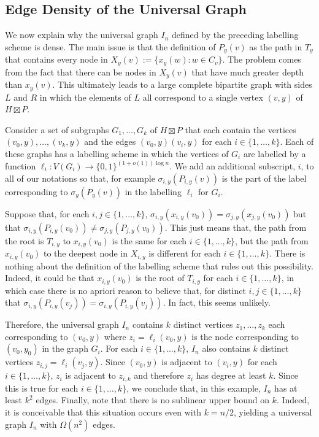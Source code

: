 \documentclass{article}
\begin{document}
\subsection{Edge Density of the Universal Graph}
\label{density-lower-bound}

We now explain why the universal graph $I_n$ defined by the preceding labelling scheme is dense.  The main issue is that the definition of $P_y(v)$ as the path in $T_y$ that contains every node in $X_y(v):=\{x_y(w):w\in C_v\}$.  The problem comes from the fact that there can be nodes in $X_y(v)$ that have much greater depth than $x_y(v)$.  This ultimately leads to a large complete bipartite graph with sides $L$ and $R$ in which the elements of $L$ all correspond to a single vertex $(v,y)$ of $H\boxtimes P$.

Consider a set of subgraphs $G_1,\ldots,G_k$ of $H\boxtimes P$ that each contain the vertices $(v_0,y),\ldots,(v_k,y)$ and the edges $(v_0,y)(v_i,y)$ for each $i\in\{1,\ldots,k\}$.  Each of these graphs has a labelling scheme in which the vertices of $G_i$ are labelled by a function $\ell_i:V(G_i)\to\{0,1\}^{(1+o(1))\log n}$.  We add an additional subscript, $i$, to all of our notations so that, for example $\sigma_{i,y}(P_{i,y}(v))$ is the part of the label corresponding to $\sigma_y(P_y(v))$ in the labelling $\ell_i$ for $G_i$.

Suppose that, for each $i,j\in\{1,\ldots,k\}$, $\sigma_{i,y}(x_{i,y}(v_0))=\sigma_{j,y}(x_{j,y}(v_0))$ but that $\sigma_{i,y}(P_{i,y}(v_0))\neq\sigma_{j,y}(P_{j,y}(v_0))$.  This just means that, the path from the root is $T_{i,y}$ to $x_{i,y}(v_0)$ is the same for each $i\in\{1,\ldots,k\}$, but the path from $x_{i,y}(v_0)$ to the deepest node in $X_{i,y}$ is different for each $i\in\{1,\ldots,k\}$.  There is nothing about the definition of the labelling scheme that rules out this possibility.  Indeed, it could be that $x_{i,y}(v_0)$ is the root of $T_{i,y}$ for each $i\in\{1,\ldots,k\}$, in which case there is no apriori reason to believe that, for distinct $i,j\in\{1,\ldots,k\}$ that $\sigma_{i,y}(P_{i,y}(v_j))=\sigma_{i,y}(P_{i,y}(v_j))$.  In fact, this seems unlikely.

Therefore, the universal graph $I_n$ contains $k$ distinct vertices $z_1,\ldots,z_k$ each corresponding to $(v_0,y)$ where $z_i=\ell_i(v_0,y)$ is the node corresponding to $(v_0,y_0)$ in the graph $G_i$.  For each $i\in\{1,\ldots,k\}$, $I_n$ also contains $k$ distinct vertices $z_{i,j}=\ell_i(v_j,y)$.  Since $(v_0,y)$ is adjacent to $(v_i,y)$ for each $i\in\{1,\ldots,k\}$, $z_i$ is adjacent to $z_{i,k}$ and therefore $z_i$ has degree at least $k$. Since this is true for each $i\in\{1,\ldots,k\}$, we conclude that, in this example, $I_n$ has at least $k^2$ edges.  Finally, note that there is no sublinear upper bound on $k$. Indeed, it is conceivable that this situation occurs even with $k=n/2$, yielding a universal graph $I_n$ with $\Omega(n^2)$ edges.
\end{document}
